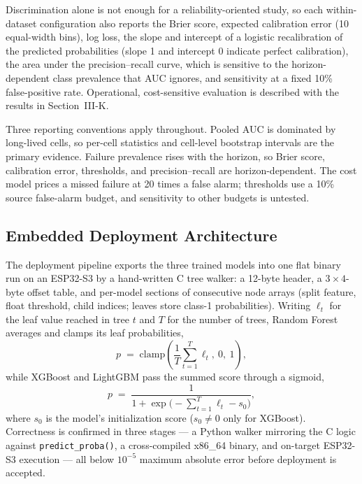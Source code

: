 \documentclass[preprint,12pt]{elsarticle}
\begin{document}
Discrimination alone is not enough for a reliability-oriented study, so each within-dataset configuration also reports the Brier score, expected calibration error (10 equal-width bins), log loss, the slope and intercept of a logistic recalibration of the predicted probabilities (slope 1 and intercept 0 indicate perfect calibration), the area under the precision--recall curve, which is sensitive to the horizon-dependent class prevalence that AUC ignores, and sensitivity at a fixed 10\% false-positive rate. Operational, cost-sensitive evaluation is described with the results in Section~III-K.

Three reporting conventions apply throughout. Pooled AUC is dominated by long-lived cells, so per-cell statistics and cell-level bootstrap intervals are the primary evidence. Failure prevalence rises with the horizon, so Brier score, calibration error, thresholds, and precision--recall are horizon-dependent. The cost model prices a missed failure at 20 times a false alarm; thresholds use a 10\% source false-alarm budget, and sensitivity to other budgets is untested.

\subsection{Embedded Deployment Architecture}
The deployment pipeline exports the three trained models into one flat binary run on an ESP32-S3 by a hand-written C tree walker: a 12-byte header, a $3{\times}4$-byte offset table, and per-model sections of consecutive node arrays (split feature, float threshold, child indices; leaves store class-1 probabilities). Writing $\ell_t$ for the leaf value reached in tree $t$ and $T$ for the number of trees, Random Forest averages and clamps its leaf probabilities,
\begin{equation}\label{eq:rf}
p \;=\; \mathrm{clamp}\!\left(\frac{1}{T}\sum_{t=1}^{T}\ell_t,\ 0,\ 1\right),
\end{equation}
while XGBoost and LightGBM pass the summed score through a sigmoid,
\begin{equation}\label{eq:sigmoid}
p \;=\; \frac{1}{1+\exp\!\bigl(-\textstyle\sum_{t=1}^{T}\ell_t - s_0\bigr)},
\end{equation}
where $s_0$ is the model's initialization score ($s_0\neq 0$ only for XGBoost). Correctness is confirmed in three stages --- a Python walker mirroring the C logic against \texttt{predict\_proba()}, a cross-compiled x86\_64 binary, and on-target ESP32-S3 execution --- all below $10^{-5}$ maximum absolute error before deployment is accepted.
\end{document}
